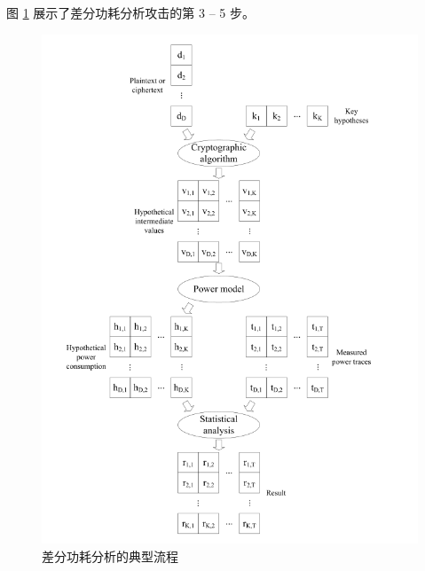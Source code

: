 图 \ref{fig:dpa} 展示了差分功耗分析攻击的第 3 -- 5 步。

\begin{figure}[htbp]

    \centering
    \includegraphics[height=.8\textheight]{../images/dpa.png}
    \caption{差分功耗分析的典型流程}
    \label{fig:dpa}
\end{figure}